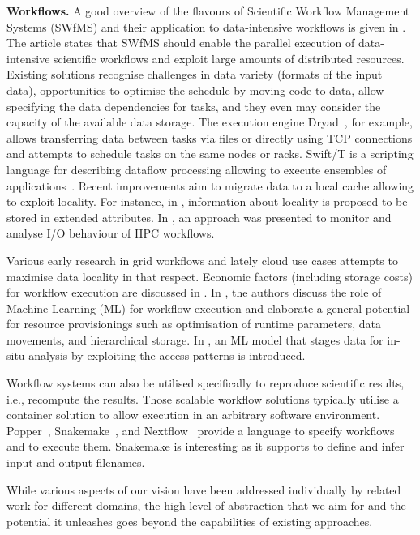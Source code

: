 \documentclass{superfri}
\begin{document}
\textbf{Workflows. }
A good overview of the flavours of Scientific Workflow Management Systems (SWfMS) and their application to data-intensive workflows is given in \cite{liu2015survey}.
The article states that SWfMS should enable the parallel execution of data-intensive scientific workflows and exploit large amounts of distributed resources.
Existing solutions recognise challenges in data variety (formats of the input data), opportunities to optimise the schedule by moving code to data, allow specifying the data dependencies for tasks, and they even may consider the capacity of the available data storage.
The execution engine Dryad~\cite{isard2007dryad}, for example, allows transferring data between tasks via files or directly using TCP connections and attempts to schedule tasks on the same nodes or racks.
Swift/T is a scripting language for describing dataflow processing allowing to execute ensembles of applications~\cite{ozik2016desktop}.
Recent improvements aim to migrate data to a local cache allowing to exploit locality.
For instance, in \cite{dai2018cross}, information about locality is proposed to be stored in extended attributes.
In \cite{TUIBIHWLSC19}, an approach was presented to monitor and analyse I/O behaviour of HPC workflows.

Various early research in grid workflows and lately cloud use cases attempts to maximise data locality in that respect.
Economic factors (including storage costs) for workflow execution are discussed in \cite{alkhanak2016cost}.
In \cite{deelman2019role}, the authors discuss the role of Machine Learning (ML) for workflow execution and elaborate a general potential for resource provisionings such as optimisation of runtime parameters, data movements, and hierarchical storage.
In \cite{subedi2019leveraging}, an ML model that stages data for in-situ analysis by exploiting the access patterns is introduced.

Workflow systems can also be utilised specifically to reproduce scientific results, i.e., recompute the results.
Those scalable workflow solutions typically utilise a container solution to allow execution in an arbitrary software environment.
Popper~\cite{jimenez2017popper}, Snakemake~\cite{bts480}, and Nextflow~\cite{Nextflow} provide a language to specify workflows and to execute them.
Snakemake is interesting as it supports to define and infer input and output filenames.

While various aspects of our vision have been addressed individually by related work for different domains, the high level of abstraction that we aim for and the potential it unleashes goes beyond the capabilities of existing approaches.
\end{document}
